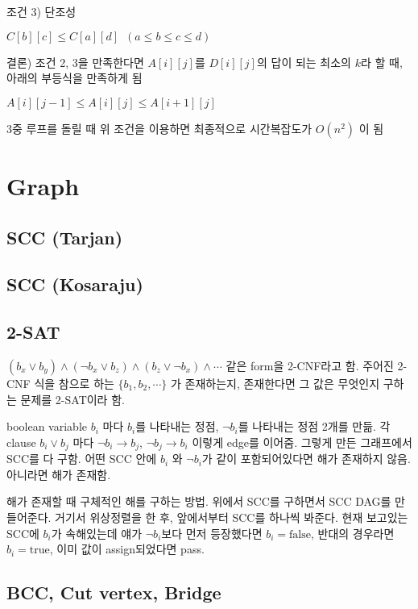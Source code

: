 \documentclass[10pt,landscape,a4paper,twocolumn]{article}
\begin{document}
조건 3) 단조성

$C[b][c] \leq C[a][d] \phantom{1} (a \leq b \leq c \leq d)$

결론) 조건 2, 3을 만족한다면  $A[i][j]$를 $D[i][j]$의 답이 되는 최소의 $k$라 할 때, 아래의 부등식을 만족하게 됨

$A[i][j-1] \leq A[i][j] \leq A[i+1][j]$

3중 루프를 돌릴 때 위 조건을 이용하면 최종적으로 시간복잡도가 $O(n^{2})$ 이 됨

\section{Graph}

\subsection{SCC (Tarjan)}

\subsection{SCC (Kosaraju)}


\subsection{2-SAT}

$(b_{x} \lor b_{y}) \land (\neg b_{x} \lor b_{z}) \land (b_{z} \lor \neg b_{x}) \land \cdots$ 같은 form을 2-CNF라고 함. 주어진 2-CNF 식을 참으로 하는 $\{ b_1, b_2, \cdots \}$ 가 존재하는지, 존재한다면 그 값은 무엇인지 구하는 문제를 2-SAT이라 함.

boolean variable $b_{i}$ 마다 $b_{i}$를 나타내는 정점, $\neg b_{i} $를 나타내는 정점 2개를 만듦. 각 clause $b_{i} \lor b_{j}$ 마다 $\neg b_{i} \to b_{j}$, $\neg b_{j} \to b_{i}$ 이렇게 edge를 이어줌. 그렇게 만든 그래프에서 SCC를 다 구함. 어떤 SCC 안에 $b_{i}$ 와 $\neg b_{i}$가 같이 포함되어있다면 해가 존재하지 않음. 아니라면 해가 존재함.

해가 존재할 때 구체적인 해를 구하는 방법. 위에서 SCC를 구하면서 SCC DAG를 만들어준다. 거기서 위상정렬을 한 후, 앞에서부터 SCC를 하나씩 봐준다. 현재 보고있는 SCC에 $b_{i}$가 속해있는데 얘가 $\neg b_{i}$보다 먼저 등장했다면 $b_{i} = \mathrm{false}$, 반대의 경우라면 $b_{i} = \mathrm{true}$, 이미 값이 assign되었다면 pass.

\subsection{BCC, Cut vertex, Bridge}

\end{document}
